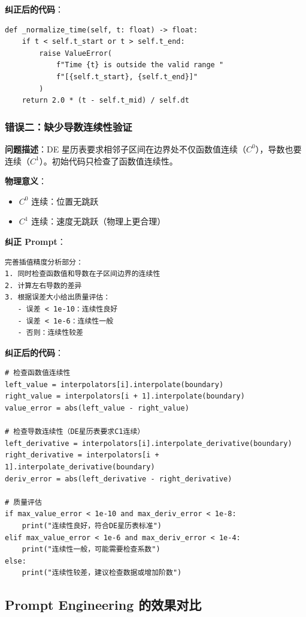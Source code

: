 \documentclass[12pt,a4paper]{article}
\begin{document}
\textbf{纠正后的代码}：
\begin{lstlisting}[caption={纠正后的归一化方法}]
def _normalize_time(self, t: float) -> float:
    if t < self.t_start or t > self.t_end:
        raise ValueError(
            f"Time {t} is outside the valid range "
            f"[{self.t_start}, {self.t_end}]"
        )
    return 2.0 * (t - self.t_mid) / self.dt
\end{lstlisting}

\subsubsection{错误二：缺少导数连续性验证}

\textbf{问题描述}：DE 星历表要求相邻子区间在边界处不仅函数值连续（$C^0$），导数也要连续（$C^1$）。初始代码只检查了函数值连续性。

\textbf{物理意义}：
\begin{itemize}
    \item $C^0$ 连续：位置无跳跃
    \item $C^1$ 连续：速度无跳跃（物理上更合理）
\end{itemize}

\textbf{纠正 Prompt}：
\begin{lstlisting}[caption={纠正连续性检查的 Prompt}]
完善插值精度分析部分：
1. 同时检查函数值和导数在子区间边界的连续性
2. 计算左右导数的差异
3. 根据误差大小给出质量评估：
   - 误差 < 1e-10：连续性良好
   - 误差 < 1e-6：连续性一般
   - 否则：连续性较差
\end{lstlisting}

\textbf{纠正后的代码}：
\begin{lstlisting}[caption={纠正后的连续性检查}]
# 检查函数值连续性
left_value = interpolators[i].interpolate(boundary)
right_value = interpolators[i + 1].interpolate(boundary)
value_error = abs(left_value - right_value)

# 检查导数连续性（DE星历表要求C1连续）
left_derivative = interpolators[i].interpolate_derivative(boundary)
right_derivative = interpolators[i + 1].interpolate_derivative(boundary)
deriv_error = abs(left_derivative - right_derivative)

# 质量评估
if max_value_error < 1e-10 and max_deriv_error < 1e-8:
    print("连续性良好，符合DE星历表标准")
elif max_value_error < 1e-6 and max_deriv_error < 1e-4:
    print("连续性一般，可能需要检查系数")
else:
    print("连续性较差，建议检查数据或增加阶数")
\end{lstlisting}

\subsection{Prompt Engineering 的效果对比}
\end{document}
